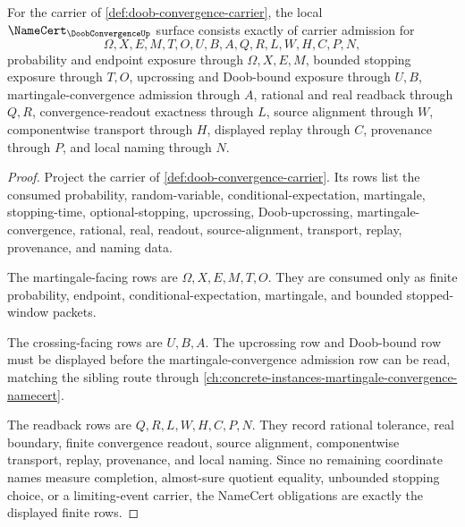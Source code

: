 \begin{theorem}
\label{thm:doob-convergence-namecert-obligations}
For the carrier of \autoref{def:doob-convergence-carrier}, the local $\NameCert_{\DoobConvergenceUp}$ surface consists exactly of carrier admission for
$$
\Omega,X,E,M,T,O,U,B,A,Q,R,L,W,H,C,P,N,
$$
probability and endpoint exposure through $\Omega,X,E,M$, bounded stopping exposure through $T,O$, upcrossing and Doob-bound exposure through $U,B$, martingale-convergence admission through $A$, rational and real readback through $Q,R$, convergence-readout exactness through $L$, source alignment through $W$, componentwise transport through $H$, displayed replay through $C$, provenance through $P$, and local naming through $N$.
\end{theorem}
\begin{proof}
Project the carrier of \autoref{def:doob-convergence-carrier}. Its rows list the consumed probability, random-variable, conditional-expectation, martingale, stopping-time, optional-stopping, upcrossing, Doob-upcrossing, martingale-convergence, rational, real, readout, source-alignment, transport, replay, provenance, and naming data.

The martingale-facing rows are $\Omega,X,E,M,T,O$. They are consumed only as finite probability, endpoint, conditional-expectation, martingale, and bounded stopped-window packets.

The crossing-facing rows are $U,B,A$. The upcrossing row and Doob-bound row must be displayed before the martingale-convergence admission row can be read, matching the sibling route through \autoref{ch:concrete-instances-martingale-convergence-namecert}.

The readback rows are $Q,R,L,W,H,C,P,N$. They record rational tolerance, real boundary, finite convergence readout, source alignment, componentwise transport, replay, provenance, and local naming. Since no remaining coordinate names measure completion, almost-sure quotient equality, unbounded stopping choice, or a limiting-event carrier, the NameCert obligations are exactly the displayed finite rows.
\end{proof}

